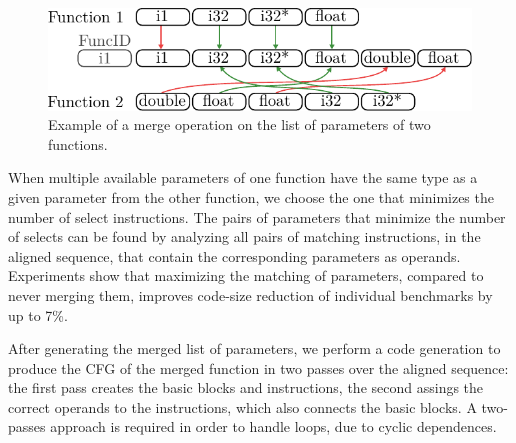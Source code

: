 \begin{figure}[h]
  \centering
  \includegraphics[width=0.9\linewidth]{figs/merged-params.pdf}
  \caption{Example of a merge operation on the list of parameters of two functions.}
  \label{fig:merged-params}
\end{figure}


When multiple available parameters of one function have the same type as a given
parameter from the other function, we choose the one that minimizes the number
of select instructions.
The pairs of parameters that minimize the number of selects can be found by
analyzing all pairs of matching instructions, in the aligned sequence, that
contain the corresponding parameters as operands.
Experiments show that maximizing the matching of parameters, compared to never
merging them, improves code-size reduction of individual benchmarks by up to 7\%.



After generating the merged list of parameters, we perform a code generation
to produce the CFG of the merged function in two passes over the aligned
sequence: the first pass creates the basic blocks and instructions,
the second assings the correct operands to the instructions, which also connects
the basic blocks.
A two-passes approach is required in order to handle loops, due to cyclic
dependences.

